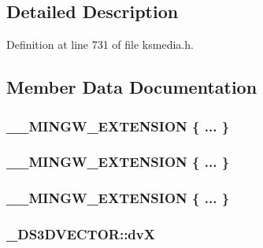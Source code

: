 \subsection{Detailed Description}


Definition at line 731 of file ksmedia.\+h.



\subsection{Member Data Documentation}
\subsubsection[{\texorpdfstring{"@187}{@187}}]{\setlength{\rightskip}{0pt plus 5cm}\+\_\+\+\_\+\+M\+I\+N\+G\+W\+\_\+\+E\+X\+T\+E\+N\+S\+I\+ON \{ ... \} }\hypertarget{struct___d_s3_d_v_e_c_t_o_r_a04b612396fb23d9e5a2c87b7515b8bce}{}\label{struct___d_s3_d_v_e_c_t_o_r_a04b612396fb23d9e5a2c87b7515b8bce}
\subsubsection[{\texorpdfstring{"@189}{@189}}]{\setlength{\rightskip}{0pt plus 5cm}\+\_\+\+\_\+\+M\+I\+N\+G\+W\+\_\+\+E\+X\+T\+E\+N\+S\+I\+ON \{ ... \} }\hypertarget{struct___d_s3_d_v_e_c_t_o_r_a724e5cf9c8e0a5370d23f8b3ec099c68}{}\label{struct___d_s3_d_v_e_c_t_o_r_a724e5cf9c8e0a5370d23f8b3ec099c68}
\subsubsection[{\texorpdfstring{"@191}{@191}}]{\setlength{\rightskip}{0pt plus 5cm}\+\_\+\+\_\+\+M\+I\+N\+G\+W\+\_\+\+E\+X\+T\+E\+N\+S\+I\+ON \{ ... \} }\hypertarget{struct___d_s3_d_v_e_c_t_o_r_aad291927ab4d40e095487fe5b0c5a2cb}{}\label{struct___d_s3_d_v_e_c_t_o_r_aad291927ab4d40e095487fe5b0c5a2cb}
\subsubsection[{\texorpdfstring{dvX}{dvX}}]{ \+\_\+\+D\+S3\+D\+V\+E\+C\+T\+O\+R\+::dvX}\hypertarget{struct___d_s3_d_v_e_c_t_o_r_acf808360eb7dfd60c535c22955b20b45}{}\label{struct___d_s3_d_v_e_c_t_o_r_acf808360eb7dfd60c535c22955b20b45}


